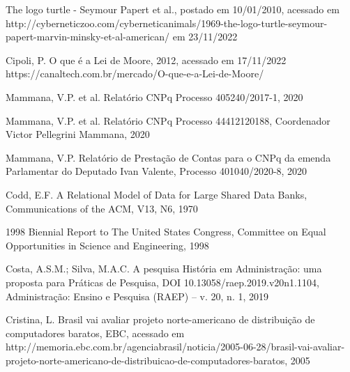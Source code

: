\begin{flushleft}
[CIBERNECTZOO, 2010] The logo turtle - Seymour Papert et al., postado em 10/01/2010, acessado em http://cyberneticzoo.com/cyberneticanimals/1969-the-logo-turtle-seymour-papert-marvin-minsky-et-al-american/ em 23/11/2022
\end{flushleft}


\begin{flushleft}
[CIPOLI, 2012] Cipoli, P. O que é a Lei de Moore, 2012, acessado em 17/11/2022 https://canaltech.com.br/mercado/O-que-e-a-Lei-de-Moore/
\end{flushleft}


\begin{flushleft}
[CNPq, 2020] Mammana, V.P. et al. Relatório CNPq Processo 405240/2017-1, 2020
\end{flushleft}


\begin{flushleft}
[CNPq, 2020a] Mammana, V.P. et al. Relatório CNPq Processo 44412120188, Coordenador Victor Pellegrini Mammana, 2020
\end{flushleft}


\begin{flushleft}
[CNPq, 2020b] Mammana, V.P. Relatório de Prestação de Contas para o CNPq da emenda Parlamentar do Deputado Ivan Valente, Processo 401040/2020-8, 2020
\end{flushleft}


\begin{flushleft}
[CODD, 1970] Codd, E.F. A Relational Model of Data for Large Shared Data Banks, Communications of the ACM, V13, N6, 1970
\end{flushleft}


\begin{flushleft}
[CONGRESS, 1998] 1998 Biennial Report to The United States Congress, Committee on Equal Opportunities in Science and Engineering, 1998
\end{flushleft}


\begin{flushleft}
 Costa, A.S.M.; Silva, M.A.C. A pesquisa História em Administração: uma proposta para Práticas de Pesquisa, DOI 10.13058/raep.2019.v20n1.1104, Administração: Ensino e Pesquisa (RAEP) – v. 20, n. 1, 2019
\end{flushleft}


\begin{flushleft}
[CRISTINA, 2005] Cristina, L. Brasil vai avaliar projeto norte-americano de distribuição de computadores baratos, EBC, acessado em http://memoria.ebc.com.br/agenciabrasil/noticia/2005-06-28/brasil-vai-avaliar-projeto-norte-americano-de-distribuicao-de-computadores-baratos, 2005
\end{flushleft}


